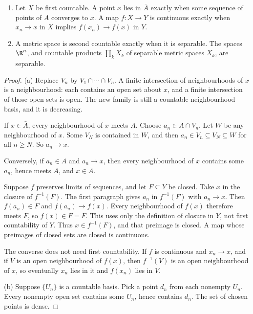 \begin{proposition}\label{prop:sequences}
\begin{enumerate}[label=(\alph*)]
\item Let $X$ be first countable. A point $x$ lies in $\bar A$ exactly when some sequence of points of $A$ converges to $x$. A map $f:X\to Y$ is continuous exactly when $x_n\to x$ in $X$ implies $f(x_n)\to f(x)$ in $Y$.
\item A metric space is second countable exactly when it is separable. The spaces $\R^n$, and countable products $\prod_k X_k$ of separable metric spaces $X_k$, are separable.
\end{enumerate}
\end{proposition}
\begin{proof}
(a) Replace $V_n$ by $V_1\cap\cdots\cap V_n$. A finite intersection of neighbourhoods of $x$ is a neighbourhood: each contains an open set about $x$, and a finite intersection of those open sets is open. The new family is still a countable neighbourhood basis, and it is decreasing.

If $x\in\bar A$, every neighbourhood of $x$ meets $A$. Choose $a_n\in A\cap V_n$. Let $W$ be any neighbourhood of $x$. Some $V_N$ is contained in $W$, and then $a_n\in V_n\subseteq V_N\subseteq W$ for all $n\ge N$. So $a_n\to x$.

Conversely, if $a_n\in A$ and $a_n\to x$, then every neighbourhood of $x$ contains some $a_n$, hence meets $A$, and $x\in\bar A$.

Suppose $f$ preserves limits of sequences, and let $F\subseteq Y$ be closed. Take $x$ in the closure of $f^{-1}(F)$. The first paragraph gives $a_n$ in $f^{-1}(F)$ with $a_n\to x$. Then $f(a_n)\in F$ and $f(a_n)\to f(x)$. Every neighbourhood of $f(x)$ therefore meets $F$, so $f(x)\in\bar F=F$. This uses only the definition of closure in $Y$, not first countability of $Y$. Thus $x\in f^{-1}(F)$, and that preimage is closed. A map whose preimages of closed sets are closed is continuous.

The converse does not need first countability. If $f$ is continuous and $x_n\to x$, and if $V$ is an open neighbourhood of $f(x)$, then $f^{-1}(V)$ is an open neighbourhood of $x$, so eventually $x_n$ lies in it and $f(x_n)$ lies in $V$.

(b) Suppose $\{U_n\}$ is a countable basis. Pick a point $d_n$ from each nonempty $U_n$. Every nonempty open set contains some $U_n$, hence contains $d_n$. The set of chosen points is dense.


\end{proof}
